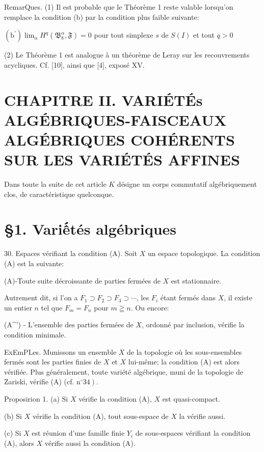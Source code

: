 RemarQues. (1) Il est probable que le Théorème 1 reste valable lorsqu'on remplace la condition (b) par la condition plus faible suivante:

$\left(\mathrm{b}^{\prime}\right) \lim _{\alpha} H^{q}\left(\mathfrak{B}_{8}^{\alpha}, \mathfrak{F}\right)=0$ pour tout simplexe $s$ de $S(I)$ et tout $q>0$

(2) Le Théorème 1 est analogue à un théorème de Leray sur les recouvrements acycliques. Cf. [10], ainsi que [4], exposé XV.

\section{CHAPITRE II. VARIÉTÉs ALGÉBRIQUES-FAISCEAUX ALGÉBRIQUES COHÉRENTS SUR LES VARIÉTÉS AFFINES}

Dans toute la suite de cet article $K$ désigne un corps commutatif algébriquement clos, de caractéristique quelconque. 

\section{§1. Variếtés algébriques}

30. Espaces vérifiant la condition (A). Soit $X$ un espace topologique. La condition (A) est la suivante:

(A)-Toute suite décroissante de parties fermées de $X$ est stationnaire.

Autrement dit, si l'on a $F_{1} \supset F_{2} \supset F_{3} \supset \cdots$, les $F_{i}$ étant fermés dans $X$, il existe un entier $n$ tel que $F_{m}=F_{n}$ pour $m \geqq n$. Ou encore:

(A^') - L'ensemble des parties fermées de $X$, ordonné par inclusion, vérifie la condition minimale.

ExEmPLes. Munissons un ensemble $X$ de la topologie où les sous-ensembles fermés sont les parties finies de $X$ et $X$ lui-même; la condition (A) est alors vérifiée. Plus généralement, toute variété algébrique, muni de la topologie de Zariski, vérifie (A) (cf. $\left.\mathrm{n}^{\circ} 34\right)$.

Proposirion 1. (a) Si $X$ vérifie la condition (A), $X$ est quasi-compact.

(b) Si $X$ vérifie la condition (A), tout sous-espace de $X$ la vérifie aussi.

(c) Si $X$ est réunion d'une famille finie $Y_{i}$ de sous-espaces vérifiant la condition (A), alors $X$ vérifie aussi la condition (A).


